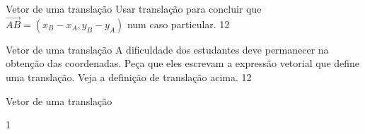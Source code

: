 \begin{objectives}{Vetor de uma translação}
{
Usar translação para concluir que \(\overrightarrow{AB} = (x_B-x_A, y_B-y_A)\) num caso particular.
}{1}{2}
\end{objectives}
\begin{sugestions}{Vetor de uma translação}
{
A dificuldade dos estudantes deve permanecer na obtenção das coordenadas. Peça que eles escrevam a expressão vetorial que define uma translação. Veja a definição de translação acima.
}{1}{2}
\end{sugestions}
\begin{answer}{Vetor de uma translação}
{

}{1}
\end{answer}


